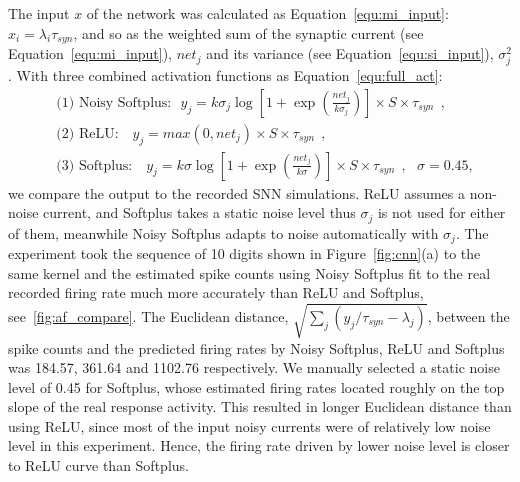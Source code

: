 	The input $x$ of the network was calculated as Equation~\ref{equ:mi_input}: $x_i=\lambda_i\tau_{syn}$, and so as the weighted sum of the synaptic current (see Equation~\ref{equ:mi_input}), $net_j$ and its variance (see Equation~\ref{equ:si_input}), $\sigma^2_j$.
	With three combined activation functions as Equation~\ref{equ:full_act}:
	\begin{equation}
	\begin{aligned}
	&\textrm{(1) Noisy Softplus:~~}  y_j=k \sigma_j \log [1 + \exp(\frac{net_j}{k \sigma_j})] \times S \times \tau_{syn}~~,  \\
	&\textrm{(2) ReLU:~~ } y_j=max(0, net_j) \times S \times \tau_{syn}~~, \\
	&\textrm{(3) Softplus:~~ } y_j=k \sigma \log [1 + \exp(\frac{net_j}{k \sigma})] \times S \times \tau_{syn}~~, ~~~\sigma=0.45,  
 	\end{aligned}
	\end{equation}	
	we compare the output to the recorded SNN simulations.
	ReLU assumes a non-noise current, and Softplus takes a static noise level thus $\sigma_j$ is not used for either of them, meanwhile Noisy Softplus adapts to noise automatically with $\sigma_j$.
	The experiment took the sequence of 10 digits shown in Figure~\ref{fig:cnn}(a) to the same kernel and the estimated spike counts using Noisy Softplus fit to the real recorded firing rate much more accurately than ReLU and Softplus,  see~\ref{fig:af_compare}.
	The Euclidean distance, $\sqrt{\sum_{j}(y_j/\tau_{syn} - \lambda_j)}$, between the spike counts and the predicted firing rates by Noisy Softplus, ReLU and Softplus was 184.57, 361.64 and 1102.76 respectively.
	We manually selected a static noise level of 0.45 for Softplus, whose estimated firing rates located roughly on the top slope of the real response activity.
	This resulted in longer Euclidean distance than using ReLU, since most of the input noisy currents were of relatively low noise level in this experiment.
	Hence, the firing rate driven by lower noise level is closer to ReLU curve than Softplus.
	
